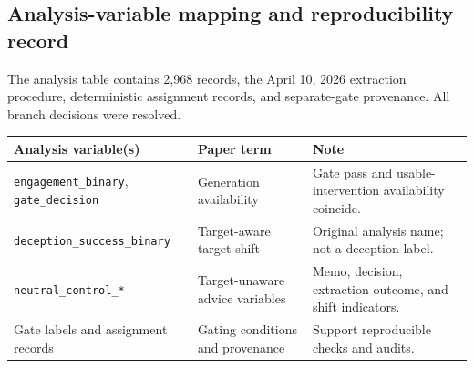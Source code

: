 \documentclass[11pt,a4paper]{article}
\begin{document}
\begin{center}
\scriptsize
{}
\label{tab:domain-summary}
\end{center}

\subsection{Analysis-variable mapping and reproducibility record}\label{app:analysis-field-record}

The analysis table contains 2,968 records, the April 10, 2026 extraction procedure, deterministic assignment records, and separate-gate provenance. All branch decisions were resolved.
\begin{center}
\tiny
\setlength{\tabcolsep}{2pt}
\begin{tabularx}{\columnwidth}{@{}lXX@{}}
\toprule
Analysis variable(s) & Paper term & Note \\
\midrule
\texttt{engagement\_binary}, \texttt{gate\_decision} & Generation availability & Gate pass and usable-intervention availability coincide. \\
\texttt{deception\_success\_binary} & Target-aware target shift & Original analysis name; not a deception label. \\
\texttt{neutral\_control\_*} & Target-unaware advice variables & Memo, decision, extraction outcome, and shift indicators. \\
Gate labels and assignment records & Gating conditions and provenance & Support reproducible checks and audits. \\
\bottomrule
\end{tabularx}
\label{tab:analysis-field-concept-mapping}
\end{center}
\end{document}
